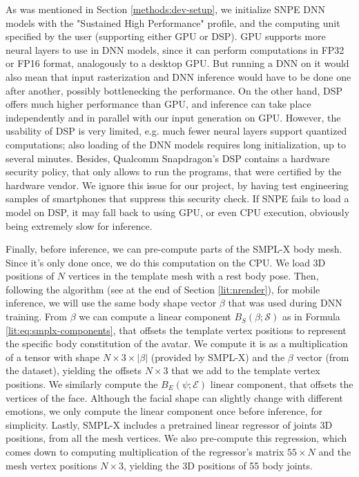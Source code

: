 As was mentioned in Section \ref{methods:dev-setup}, we initialize SNPE DNN models with the "Sustained High Performance" profile, and the computing unit specified by the user (supporting either GPU or DSP). GPU supports more neural layers to use in DNN models, since it can perform computations in FP32 or FP16 format, analogously to a desktop GPU. But running a DNN on it would also mean that input rasterization and DNN inference would have to be done one after another, possibly bottlenecking the performance. On the other hand, DSP offers much higher performance than GPU, and inference can take place independently and in parallel with our input generation on GPU. However, the usability of DSP is very limited, e.g. much fewer neural layers support quantized computations; also loading of the DNN models requires long initialization, up to several minutes. Besides, Qualcomm Snapdragon's DSP contains a hardware security policy, that only allows to run the programs, that were certified by the hardware vendor. We ignore this issue for our project, by having test engineering samples of smartphones that suppress this security check. If SNPE fails to load a model on DSP, it may fall back to using GPU, or even CPU execution, obviously being extremely slow for inference.

Finally, before inference, we can pre-compute parts of the SMPL-X \cite{dnn:smplx19} body mesh. Since it's only done once, we do this computation on the CPU. We load 3D positions of $N$ vertices in the template mesh with a rest body pose. Then, following the algorithm (see at the end of Section \ref{lit:nrender}), for mobile inference, we will use the same body shape vector $\beta$ that was used during DNN training. From $\beta$ we can compute a linear component $B_S(\beta; \mathcal{S})$ as in Formula \ref{lit:eq:smplx-components}, that offsets the template vertex positions to represent the specific body constitution of the avatar. We compute it is as a multiplication of a tensor with shape $N \times 3 \times \lvert\beta\rvert$ (provided by SMPL-X) and the $\beta$ vector (from the dataset), yielding the offsets $N \times 3$ that we add to the template vertex positions. We similarly compute the $B_E(\psi; \mathcal{E})$ linear component, that offsets the vertices of the face. Although the facial shape can slightly change with different emotions, we only compute the linear component once before inference, for simplicity. Lastly, SMPL-X includes a pretrained linear regressor of joints 3D positions, from all the mesh vertices. We also pre-compute this regression, which comes down to computing multiplication of the regressor's matrix $55 \times N$ and the mesh vertex positions $N \times 3$, yielding the 3D positions of 55 body joints. 

